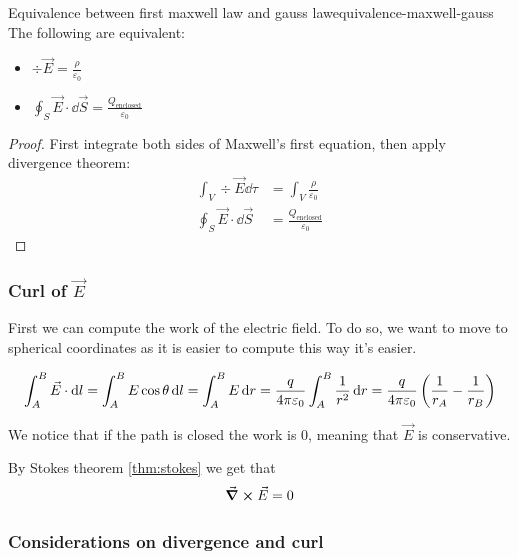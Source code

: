 \documentclass[12pt]{extarticle}
\begin{document}
\begin{proposition}{Equivalence between first maxwell law and gauss law}{equivalence-maxwell-gauss}
    The following are equivalent:
    \begin{itemize}
        \item $\div \vec E = \frac{\rho}{\varepsilon_0}$
        \item $\oint_S \vec E \cdot \dd{\vec S} = \frac{Q_\text{enclosed}}{\varepsilon_0}$
    \end{itemize}
\end{proposition}

\begin{proof}
    First integrate both sides of Maxwell's first equation, then apply divergence theorem:
    \begin{align}
        \int_V \div \vec E \dd{\tau}     & = \int_V \frac{\rho}{\varepsilon_0}       \\
        \oint_S \vec E \cdot \dd{\vec S} & = \frac{Q_\text{enclosed}}{\varepsilon_0}
    \end{align}
\end{proof}

\subsubsection{Curl of \texorpdfstring{$\vec E$}{the electric field}}
\label{sec:curl-electric}

First we can compute the work of the electric field.
To do so, we want to move to spherical coordinates as it is easier to compute this way it's easier.

\begin{equation}
    \label{eq:potential-electric-point}
    \int_A^B \vec E \cdot \dd{l} = \int_A^B E \cos \theta \dd{l} = \int_A^B E \dd{r} = \frac{q}{4 \pi \varepsilon_0} \int_A^B \frac{1}{r^2} \dd{r} = \frac{q}{4 \pi \varepsilon_0} \left(\frac{1}{r_A} - \frac{1}{r_B}\right)
\end{equation}

We notice that if the path is closed the work is $0$, meaning that $\vec E$ is conservative.

By Stokes theorem \cref{thm:stokes} we get that
\begin{equation}
    \curl \vec E = 0
\end{equation}

\subsubsection{Considerations on divergence and curl}
\end{document}
